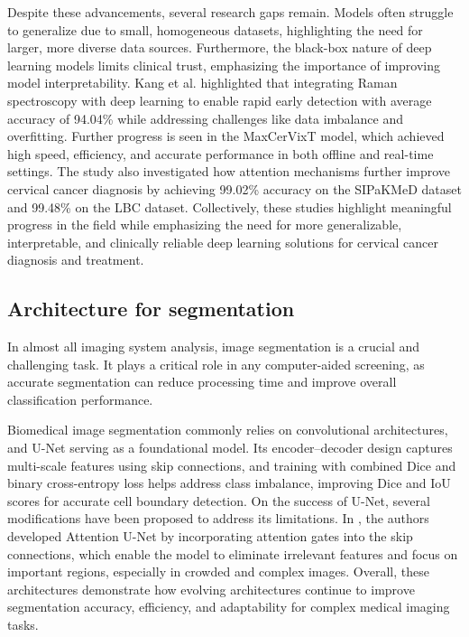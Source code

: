 \documentclass[pdflatex,sn-nature]{sn-jnl}%
\theoremstyle{thmstyleone}%
\theoremstyle{thmstyletwo}%
\theoremstyle{thmstylethree}%
\begin{document}
Despite these advancements, several research gaps remain. Models often struggle to generalize due to small, homogeneous datasets, highlighting the need for larger, more diverse data sources. Furthermore, the black-box nature of deep learning models limits clinical trust, emphasizing the importance of improving model interpretability. Kang et al.\cite{Lite16} highlighted that integrating Raman spectroscopy with deep learning to enable rapid early detection with average accuracy of 94.04\% while addressing challenges like data imbalance and overfitting. Further progress is seen in the MaxCerVixT model, which achieved high speed, efficiency, and accurate performance in both offline and real-time settings. The study also investigated how attention mechanisms further improve cervical cancer diagnosis by achieving 99.02\% accuracy on the SIPaKMeD dataset and 99.48\% on the LBC dataset\cite{Lite17}. Collectively, these studies highlight meaningful progress in the field while emphasizing the need for more generalizable, interpretable, and clinically reliable deep learning solutions for cervical cancer diagnosis and treatment.

\subsection{Architecture for segmentation}

In almost all imaging system analysis, image segmentation is a crucial and challenging task. It plays a critical role in any computer-aided screening, as accurate segmentation can reduce processing time and improve overall classification performance.

Biomedical image segmentation commonly relies on convolutional architectures, and U-Net\cite{Lite7} serving as a foundational model. Its encoder–decoder design captures multi-scale features using skip connections, and training with combined Dice and binary cross-entropy loss helps address class imbalance, improving Dice and IoU scores for accurate cell boundary detection. On the success of U-Net, several modifications have been proposed to address its limitations. In \cite{Lite19}, the authors developed Attention U-Net by incorporating attention gates into the skip connections, which enable the model to eliminate irrelevant features and focus on important regions, especially in crowded and complex images. Overall, these architectures demonstrate how evolving architectures continue to improve segmentation accuracy, efficiency, and adaptability for complex medical imaging tasks. 
\end{document}
